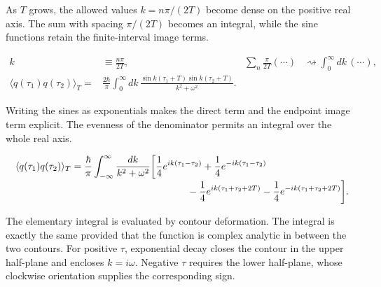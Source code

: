 As $T$ grows, the allowed values $k=n\pi/(2T)$ become dense on the positive
real axis.  The sum with spacing $\pi/(2T)$ becomes an integral, while the sine
functions retain the finite-interval image terms.

\begin{align}
  k&\equiv\frac{n\pi}{2T},
  &\sum_n\frac{\pi}{2T}(\cdots)&\rightsquigarrow
  \int_0^\infty dk\,(\cdots),
  \label{eq:proposal-sum-to-integral}\\
  \langle q(\tau_1)q(\tau_2)\rangle_T
  ={}&\frac{2\hbar}{\pi}\int_0^\infty dk\,
  \frac{\sin k(\tau_1+T)\sin k(\tau_2+T)}{k^2+\omega^2}.
  \label{eq:proposal-half-line-covariance}
\end{align}

Writing the sines as exponentials makes the direct term and the endpoint image
term explicit.  The evenness of the denominator permits an integral over the
whole real axis.

\begin{align}
  \langle q(\tau_1)q(\tau_2)\rangle_T
  ={}&\frac{\hbar}{\pi}\int_{-\infty}^{\infty}
  \frac{dk}{k^2+\omega^2}
  \biggl[
  \frac14e^{ik(\tau_1-\tau_2)}
  +\frac14e^{-ik(\tau_1-\tau_2)}
  \nonumber\\[-1mm]
  &\hspace{37mm}
  -\frac14e^{ik(\tau_1+\tau_2+2T)}
  -\frac14e^{-ik(\tau_1+\tau_2+2T)}
  \biggr].
  \label{eq:proposal-full-line-covariance}
\end{align}

The elementary integral is evaluated by contour deformation.  The integral is
exactly the same provided that the function is complex analytic in between the
two contours.  For positive $\tau$, exponential decay closes the contour in
the upper half-plane and encloses $k=i\omega$.  Negative $\tau$ requires the
lower half-plane, whose clockwise orientation supplies the corresponding
sign.

